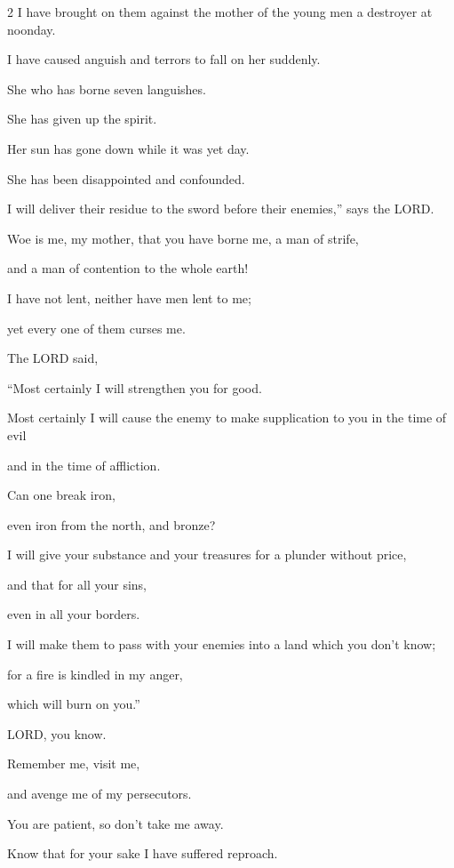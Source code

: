 \begin{multicols}{2}
I have brought on them against the mother of the young men a destroyer at noonday.

I have caused anguish and terrors to fall on her suddenly.


\myverse{}She who has borne seven languishes.

She has given up the spirit.

Her sun has gone down while it was yet day.

She has been disappointed and confounded.

I will deliver their residue to the sword before their enemies,” says the LORD.

\vspace{\baselineskip}

\myverse{}Woe is me, my mother, that you have borne me, a man of strife,

and a man of contention to the whole earth!

I have not lent, neither have men lent to me;

yet every one of them curses me.


\myverse{}The LORD said,

“Most certainly I will strengthen you for good.

Most certainly I will cause the enemy to make supplication to you in the time
of evil

and in the time of affliction.


\myverse{}Can one break iron,

even iron from the north, and bronze?


\myverse{}I will give your substance and your treasures for a plunder
without price,

and that for all your sins,

even in all your borders.


\myverse{}I will make them to pass with your enemies into a land which
you don’t know;

for a fire is kindled in my anger,

which will burn on you.”

\vspace{\baselineskip}

\myverse{}LORD, you know.

Remember me, visit me,

and avenge me of my persecutors.

You are patient, so don’t take me away.

Know that for your sake I have suffered reproach.



\end{multicols}
